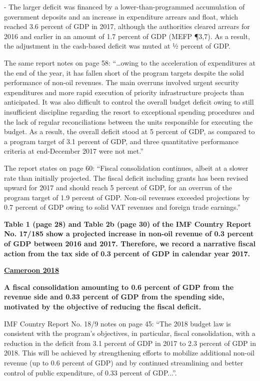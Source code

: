 - The larger deficit was financed by a lower-than-programmed accumulation of government deposits and an increase in expenditure arrears and float, which reached 3.6 percent of GDP in 2017, although the authorities cleared arrears for 2016 and earlier in an amount of 1.7 percent of GDP (MEFP ¶3,7). As a result, the adjustment in the cash-based deficit was muted at ½ percent of GDP.

The same report notes on page 58: “…owing to the acceleration of expenditures at the end of the year, it has fallen short of the program targets despite the solid performance of non-oil revenues. The main overruns involved urgent security expenditures and more rapid execution of priority infrastructure projects than anticipated. It was also difficult to control the overall budget deficit owing to still insufficient discipline regarding the resort to exceptional spending procedures and the lack of regular reconciliations between the units responsible for executing the budget. As a result, the overall deficit stood at 5 percent of GDP, as compared to a program target of 3.1 percent of GDP, and three quantitative performance criteria at end-December 2017 were not met.”

The report states on page 60: “Fiscal consolidation continues, albeit at a slower rate than initially projected. The fiscal deficit including grants has been revised upward for 2017 and should reach 5 percent of GDP, for an overrun of the program target of 1.9 percent of GDP. Non-oil revenues exceeded projections by 0.7 percent of GDP owing to solid VAT revenues and foreign trade earnings.”

\textbf{Table 1 (page 28) and Table 2b (page 30) of the IMF Country Report No. 17/185 show a projected increase in non-oil revenue of 0.3 percent of GDP between 2016 and 2017. Therefore, we record a narrative fiscal action from the tax side of 0.3 percent of GDP in calendar year 2017.}

\textbf{\underline{Cameroon 2018}}

\textbf{A fiscal consolidation amounting to 0.6 percent of GDP from the revenue side and 0.33 percent of GDP from the spending side, motivated by the objective of reducing the fiscal deficit.}

IMF Country Report No. 18/9 notes on page 45: “The 2018 budget law is consistent with the program’s objectives, in particular, fiscal consolidation, with a reduction in the deficit from 3.1 percent of GDP in 2017 to 2.3 percent of GDP in 2018. This will be achieved by strengthening efforts to mobilize additional non-oil revenue (up to 0.6 percent of GDP) and by continued streamlining and better control of public expenditure, of 0.33 percent of GDP...”.

